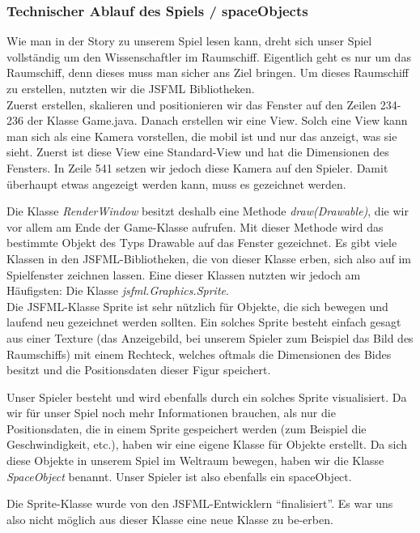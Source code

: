 \documentclass[12pt,a4paper]{scrartcl}
\newcommand{\q}[1]{``#1''}
\begin{document}
\subsubsection{Technischer Ablauf des Spiels / spaceObjects}
Wie man in der Story zu unserem Spiel lesen kann, dreht sich unser Spiel vollständig um den Wissenschaftler im Raumschiff. Eigentlich geht es nur um das Raumschiff, denn dieses muss man sicher ans Ziel bringen.
Um dieses Raumschiff zu erstellen, nutzten wir die JSFML Bibliotheken.	\\

Zuerst erstellen, skalieren und positionieren wir das Fenster auf den Zeilen 234-236 der Klasse Game.java.
Danach erstellen wir eine View.
Solch eine View kann man sich als eine Kamera vorstellen, die mobil ist und nur das anzeigt, was sie sieht.
Zuerst ist diese View eine Standard-View und hat die Dimensionen des Fensters.
In Zeile 541 setzen wir jedoch diese Kamera auf den Spieler.
Damit überhaupt etwas angezeigt werden kann, muss es gezeichnet werden. 

Die Klasse \textit{RenderWindow} besitzt deshalb eine Methode \textit{draw(Drawable)}, die wir vor allem am Ende der Game-Klasse aufrufen.
Mit dieser Methode wird das bestimmte Objekt des Typs Drawable auf das Fenster gezeichnet.
Es gibt viele Klassen in den JSFML-Bibliotheken, die von dieser Klasse erben, sich also auf im Spielfenster zeichnen lassen.
Eine dieser Klassen nutzten wir jedoch am Häufigsten: Die Klasse \textit{jsfml.Graphics.Sprite}.		\\
Die JSFML-Klasse Sprite ist sehr nützlich für Objekte, die sich bewegen und laufend neu gezeichnet werden sollten.
Ein solches Sprite besteht einfach gesagt aus einer Texture (das Anzeigebild, bei unserem Spieler zum Beispiel das Bild des Raumschiffs) mit einem Rechteck,
welches oftmals die Dimensionen des Bides besitzt und die Positionsdaten dieser Figur speichert.

Unser Spieler besteht und wird ebenfalls durch ein solches Sprite visualisiert.
Da wir für unser Spiel noch mehr Informationen brauchen, als nur die Positionsdaten, die in einem
Sprite gespeichert werden (zum Beispiel die Geschwindigkeit, etc.), haben wir eine eigene Klasse für Objekte erstellt. Da sich diese Objekte
in unserem Spiel im Weltraum bewegen, haben wir die Klasse \textit{SpaceObject} benannt. Unser Spieler ist also ebenfalls ein spaceObject.

Die Sprite-Klasse wurde von den JSFML-Entwicklern \q{finalisiert}. Es war uns also nicht
möglich aus dieser Klasse eine neue Klasse zu be-erben.
\end{document}
